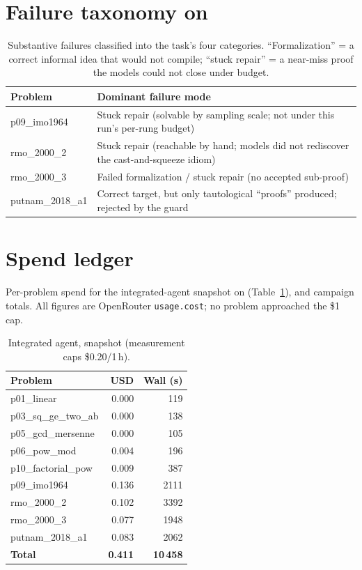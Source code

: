 \section{Failure taxonomy on \Sdev}
\label{app:failtax}

\begin{table}[h]
\centering
\caption{Substantive failures classified into the task's four categories.
``Formalization'' = a correct informal idea that would not compile; ``stuck
repair'' = a near-miss proof the models could not close under budget.}
\begin{tabular}{@{}lp{7.2cm}@{}}
\toprule
Problem & Dominant failure mode \\
\midrule
p09\_imo1964     & Stuck repair (solvable by sampling scale; not under this run's per-rung budget) \\
rmo\_2000\_2     & Stuck repair (reachable by hand; models did not rediscover the cast-and-squeeze idiom) \\
rmo\_2000\_3     & Failed formalization / stuck repair (no accepted sub-proof) \\
putnam\_2018\_a1 & Correct target, but only tautological ``proofs'' produced; rejected by the guard \\
\bottomrule
\end{tabular}
\end{table}

\section{Spend ledger}
\label{app:ledger}

Per-problem spend for the integrated-agent snapshot on \Sdev{}
(Table~\ref{tab:ledger}), and campaign totals. All figures are OpenRouter
\texttt{usage.cost}; no problem approached the \$1 cap.

\begin{table}[h]
\centering
\caption{Integrated agent, \Sdev{} snapshot (measurement caps \$0.20/1\,h).}
\label{tab:ledger}
\begin{tabular}{@{}lrr@{}}
\toprule
Problem & USD & Wall (s) \\
\midrule
p01\_linear & 0.000 & 119 \\
p03\_sq\_ge\_two\_ab & 0.000 & 138 \\
p05\_gcd\_mersenne & 0.000 & 105 \\
p06\_pow\_mod & 0.004 & 196 \\
p10\_factorial\_pow & 0.009 & 387 \\
p09\_imo1964 & 0.136 & 2111 \\
rmo\_2000\_2 & 0.102 & 3392 \\
rmo\_2000\_3 & 0.077 & 1948 \\
putnam\_2018\_a1 & 0.083 & 2062 \\
\midrule
\textbf{Total} & \textbf{0.411} & \textbf{10\,458} \\
\bottomrule
\end{tabular}
\end{table}

